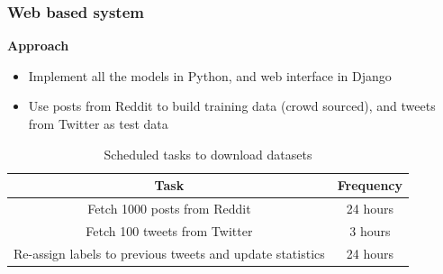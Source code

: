\documentclass[9pt]{beamer}
\begin{document}
    \begin{frame}
        \frametitle{Web based system}
        \begin{center}
            \textbf{Approach}
        \end{center}
        \begin{itemize}
            \item{Implement all the models in Python, and web interface in Django}
            \item{Use posts from Reddit to build training data (crowd sourced), and tweets from Twitter as test data}
        \end{itemize}
        \begin{table}
            \begin{center}
                \begin{tabular}{ | c | c | }
                    \hline
                    \textbf{Task} & \textbf{Frequency} \\
                    \hline
                    Fetch 1000 posts from Reddit & 24 hours \\
                    \hline
                    Fetch 100 tweets from Twitter & 3 hours \\
                    \hline
                    Re-assign labels to previous tweets and update statistics & 24 hours \\
                    \hline
                \end{tabular}
            \end{center}
            \caption{Scheduled tasks to download datasets}
        \end{table}
    \end{frame}
\end{document}
